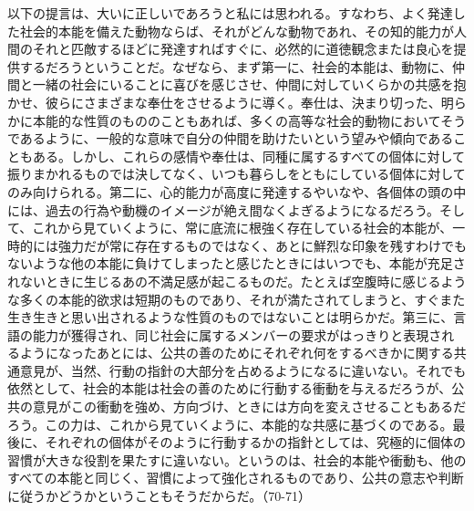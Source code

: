 以下の提言は、大いに正しいであろうと私には思われる。すなわち、よく発達した社会的本能を備えた動物ならば、それがどんな動物であれ、その知的能力が人間のそれと匹敵するほどに発達すればすぐに、必然的に道徳観念または良心を提供するだろうということだ。なぜなら、まず第一に、社会的本能は、動物に、仲間と一緒の社会にいることに喜びを感じさせ、仲間に対していくらかの共感を抱かせ、彼らにさまざまな奉仕をさせるように導く。奉仕は、決まり切った、明らかに本能的な性質のもののこともあれば、多くの高等な社会的動物においてそうであるように、一般的な意味で自分の仲間を助けたいという望みや傾向であることもある。しかし、これらの感情や奉仕は、同種に属するすべての個体に対して振りまかれるものでは決してなく、いつも暮らしをともにしている個体に対してのみ向けられる。第二に、心的能力が高度に発達するやいなや、各個体の頭の中には、過去の行為や動機のイメージが絶え間なくよぎるようになるだろう。そして、これから見ていくように、常に底流に根強く存在している社会的本能が、一時的には強力だが常に存在するものではなく、あとに鮮烈な印象を残すわけでもないような他の本能に負けてしまったと感じたときにはいつでも、本能が充足されないときに生じるあの不満足感が起こるものだ。たとえば空腹時に感じるような多くの本能的欲求は短期のものであり、それが満たされてしまうと、すぐまた生き生きと思い出されるような性質のものではないことは明らかだ。第三に、言語の能力が獲得され、同じ社会に属するメンバーの要求がはっきりと表現されるようになったあとには、公共の善のためにそれぞれ何をするべきかに関する共通意見が、当然、行動の指針の大部分を占めるようになるに違いない。それでも依然として、社会的本能は社会の善のために行動する衝動を与えるだろうが、公共の意見がこの衝動を強め、方向づけ、ときには方向を変えさせることもあるだろう。この力は、これから見ていくように、本能的な共感に基づくのである。最後に、それぞれの個体がそのように行動するかの指針としては、究極的に個体の習慣が大きな役割を果たすに違いない。というのは、社会的本能や衝動も、他のすべての本能と同じく、習慣によって強化されるものであり、公共の意志や判断に従うかどうかということもそうだからだ。（70-71）

\subsection{}


